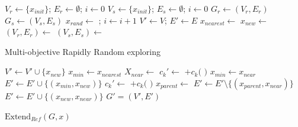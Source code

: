\documentclass[conference]{IEEEtran}
\theoremstyle{definition}
\begin{document}
\begin{algorithm}
\begin{algorithmic}[1]
	\State $ V_{r} \leftarrow \{ x_{init} \} $; $ E_{r} \leftarrow \emptyset $; $ i \leftarrow 0 $
\EndFor
{} 
	\State $ V_{s} \leftarrow \{ x_{init} \} $; $ E_{s} \leftarrow \emptyset $; $ i \leftarrow 0 $
\EndFor
{}
		\State $ G_{r} \leftarrow (V_{r}, E_{r}) $
	\EndFor
		\State $ G_{s} \leftarrow (V_{s}, E_{s}) $
	\EndFor
	\State $ x_{rand} \leftarrow $  ; $ i \leftarrow i + 1 $
	\State $ V' \leftarrow V $; $ E' \leftarrow E $
	\State $ x_{nearest} \leftarrow $ 
	\State $ x_{new} \leftarrow $ 
		\State $ (V_{r}, E_{r}) \leftarrow $ 
		\EndFor
		\State $ (V_{s}, E_{s}) \leftarrow $ 
		\EndFor
	\EndIf
\EndWhile
\end{algorithmic}
\label{alg:rapidly_exploring_process}
\caption{Multi-objective Rapidly Random exploring }
\end{algorithm}

\begin{algorithm}
\begin{algorithmic}[1]
\State $ V' \leftarrow V' \cup \{ x_{new} \} $
\State $ x_{min} \leftarrow x_{nearest} $
\State $ X_{near} \leftarrow $ 
		\State $ c_{k}' \leftarrow $  $ + c_{k}( $  $ ) $ 
		\State $ x_{min} \leftarrow x_{near} $
		\EndIf
	\EndIf
\EndFor
\State $ E' \leftarrow E' \cup \{ ( x_{min}, x_{new} ) \} $
	    \State $ c_{k}' \leftarrow $  $ + c_{k}( $  $ ) $ 
			\State $ x_{parent} \leftarrow $ 
			\State $ E' \leftarrow E' \setminus \{ ( x_{parent}, x_{near} ) \} $
			\State $ E' \leftarrow E' \cup \{ ( x_{new}, x_{near} ) \} $
		\EndIf
	\EndIf
\EndFor
\Return $ G' = (V', E') $ 
\end{algorithmic}
\label{alg:morrtstar:extend:ref}
\caption{ $ \mbox{Extend}_{Ref} (G, x) $}
\end{algorithm} 
\end{document}
